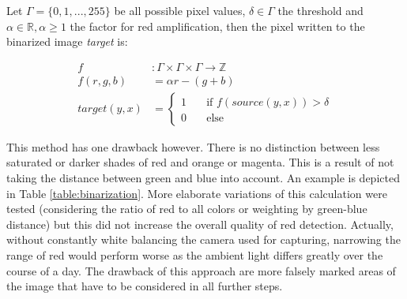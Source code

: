\documentclass{report}
\begin{document}
Let \( \Gamma = \{0, 1, ..., 255\} \) be all possible pixel values, \(
\delta \in \Gamma \) the threshold and \( \alpha \in \mathbb{R},
\alpha \geq 1 \) the factor for red amplification, then the pixel
written to the binarized image \textit{target} is:

\begin{equation}\label{eq:binarization}
  \begin{split}
    f & : \Gamma \times \Gamma \times \Gamma \to \mathbb{Z} \\
    f(r, g, b) & = \alpha r - (g + b) \\
    target(y, x) & =
    \begin{cases}
      1 & \quad \text{if } f(source(y, x)) > \delta \\
      0 & \quad \text{else}
    \end{cases}
  \end{split}
\end{equation}

This method has one drawback however. There is no distinction between
less saturated or darker shades of red and orange or magenta. This is
a result of not taking the distance between green and blue into
account. An example is depicted in Table
\ref{table:binarization}. More elaborate variations of this
calculation were tested (considering the ratio of red to all colors or
weighting by green-blue distance) but this did not increase the
overall quality of red detection. Actually, without constantly white
balancing the camera used for capturing, narrowing the range of red
would perform worse as the ambient light differs greatly over the
course of a day. The drawback of this approach are more falsely marked
areas of the image that have to be considered in all further steps.
\end{document}
